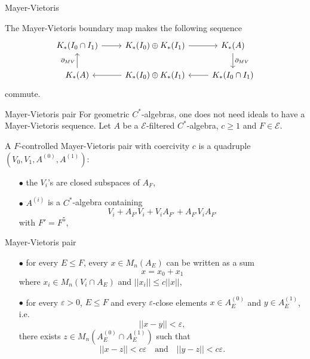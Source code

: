 \begin{frame}{Mayer-Vietoris}
\begin{thmfr}
The Mayer-Vietoris boundary map makes the following sequence 
\[\begin{tikzcd}[ampersand replacement=\&]
 K_*( I_0\cap I_1) \arrow{r} \& K_*(I_0) \oplus K_*(I_1) \arrow{r} \& K_*(A) \arrow{d}{\partial_{MV}} \\ 
K_*(A) \arrow{u}{\partial_{MV}} \& K_*(I_0) \oplus  K_*(I_1) \arrow{l} \& K_*( I_0 \cap I_1) \arrow{l}
\end{tikzcd}\] 
commute.
\end{thmfr}
\end{frame}

\begin{frame}{Mayer-Vietoris pair}
For geometric $C^*$-algebras, one does not need ideals to have a Mayer-Vietoris sequence.
Let $A$ be a $\mathcal E$-filtered $C^*$-algebra, $c\geq 1$ and $F\in \mathcal E$.
\begin{definition}
 A $F$-controlled Mayer-Vietoris pair with coercivity $c$ is a quadruple $(V_0, V_1, A^{(0)}, A^{(1)})$:
\begin{itemize}
\item[$\bullet$] the $V_i$'s are closed subspaces of $A_F$,
\item[$\bullet$] $A^{(i)}$ is a $C^*$-algebra containing \[ V_i + A_{F'} V_i + V_i A_{F'}  + A_{F'} V_i A_{F'}\]
with $F' = F^5$,
\end{itemize}
\end{definition}
\end{frame}

\begin{frame}{Mayer-Vietoris pair}
\begin{definition}
\begin{itemize}
\item[$\bullet$] for every $E\leq F$, every $x\in M_n(A_E)$ can be written as a sum \[x=x_0+x_1\] where $x_i\in M_n(V_i \cap A_E)$ and $|| x_i|| \leq c||x||$,
\item[$\bullet$] for every $\varepsilon>0$, $E\leq F$ and every $\varepsilon$-close elements $x\in A_E^{(0)}$ and $y\in A_E^{(1)}$, i.e.
\[|| x-y || < \varepsilon,\]
there exists $z\in M_n( A_E^{(0)}\cap A_E^{(1)})$ such that \[ ||x-z|| < c\varepsilon \quad \text{and} \quad ||y-z|| < c\varepsilon .\]
\end{itemize}
\end{definition}
\end{frame}

